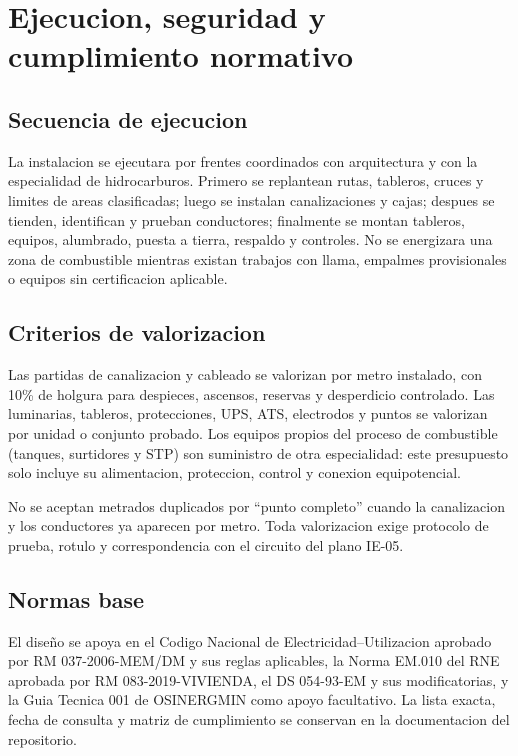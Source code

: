 \chapter{Ejecucion, seguridad y cumplimiento normativo}
\thispagestyle{memoria}\pagestyle{memoria}

\section{Secuencia de ejecucion}
La instalacion se ejecutara por frentes coordinados con arquitectura y con la
especialidad de hidrocarburos. Primero se replantean rutas, tableros, cruces y
limites de areas clasificadas; luego se instalan canalizaciones y cajas; despues
se tienden, identifican y prueban conductores; finalmente se montan tableros,
equipos, alumbrado, puesta a tierra, respaldo y controles. No se energizara una
zona de combustible mientras existan trabajos con llama, empalmes provisionales
o equipos sin certificacion aplicable.

\section{Criterios de valorizacion}
Las partidas de canalizacion y cableado se valorizan por metro instalado, con
10\% de holgura para despieces, ascensos, reservas y desperdicio controlado. Las
luminarias, tableros, protecciones, UPS, ATS, electrodos y puntos se valorizan por
unidad o conjunto probado. Los equipos propios del proceso de combustible
(tanques, surtidores y STP) son suministro de otra especialidad: este presupuesto
solo incluye su alimentacion, proteccion, control y conexion equipotencial.

No se aceptan metrados duplicados por ``punto completo'' cuando la canalizacion y
los conductores ya aparecen por metro. Toda valorizacion exige protocolo de
prueba, rotulo y correspondencia con el circuito del plano IE-05.

\section{Normas base}
El diseño se apoya en el Codigo Nacional de Electricidad--Utilizacion aprobado por RM 037-2006-MEM/DM y sus reglas aplicables, la Norma EM.010 del RNE aprobada por RM 083-2019-VIVIENDA, el DS 054-93-EM y sus modificatorias, y la Guia Tecnica 001 de OSINERGMIN como apoyo facultativo. La lista exacta, fecha de consulta y matriz de cumplimiento se conservan en la documentacion del repositorio.

